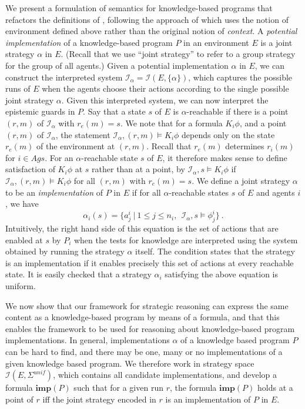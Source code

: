 \documentclass[a4wide]{article}
\theoremstyle{examplesty}
\newcommand{\Ags}{\mathit{Ags}}
\newcommand{\I}{\mathcal{I}}
\newcommand{\Env}{E}
\newcommand{\sgy}{\alpha}
\newcommand{\unif}{\mathit{unif}}
\newcommand{\Strat}{\Sigma}
\begin{document}
We present a formulation of semantics for knowledge-based programs that 
refactors the definitions of \cite{FHMV1997}, following the approach 
of \cite{MeydenTARK96} which uses the 
notion of environment defined above rather than the original notion of {\em context}. 
A {\em potential implementation} of a knowledge-based program $P$ in an environment $\Env$
is a joint strategy $\sgy$  in $\Env$. 
(Recall that we use ``joint strategy'' to refer to a group strategy for the group of all agents.)
Given  a potential implementation $\sgy$  in $\Env$, 
we can construct the interpreted system 
$\I_\sgy= \I(\Env,\{\sgy\})$, 
which captures the possible runs of $\Env$ when 
the agents choose their actions according to the single possible joint strategy $\sgy$. 
Given this interpreted system, we can now interpret the epistemic guards in $P$. 
Say that a state $s$ of $\Env$ is $\sgy$-reachable if there is a point $(r,m)$ of 
$\I_\sgy$ 
with $r_e(m) = s$. 
We note that for a formula $K_i \phi$, and a point $(r,m)$ of  $\I_\sgy$, 
the statement $\I_\sgy,(r,m) \models K_i \phi$ depends only on the state $r_e(m)$
of the environment at $(r,m)$. 
Recall that $r_e(m)$ determines $r_i(m)$ for $i \in \Ags$. 
For an $\sgy$-reachable state $s$ of  $\Env$, 
it therefore makes sense to define satisfaction of $K_i\phi$ at $s$ rather than at a point, by 
$\I_\sgy,s \models K_i \phi$ if  $\I_\sgy,(r,m) \models K_i \phi$ for all $(r,m)$ with $r_e(m) = s$. 
We define 
a joint strategy 
$\sgy$ to be an {\em implementation} of $P$ in $\Env$ if for all 
$\sgy$-reachable states $s$ of $\Env$ and agents $i$, we have 
$$ \sgy_i(s) = \{ a^i_j ~|~  1\leq j\leq n_i,~~\I_\sgy,s \models \phi^i_j\}~.$$
Intuitively, the right hand side of this equation is the set of actions that are 
enabled at $s$ by $P_i$ when the tests for knowledge are interpreted using the system 
obtained by running the strategy $\sgy$ itself. 
The condition states that the strategy is an implementation 
if it enables precisely this set of actions at every reachable state. 
It is easily checked that a strategy $\alpha_i$ satisfying the above equation is uniform. 

We now show that our framework for strategic reasoning can express the 
same content as a knowledge-based program by means of a formula, and that this 
enables the framework to be used for reasoning about knowledge-based program 
implementations. 
In general, implementations $\alpha$ of a knowledge based program $P$ can be hard to find, and
there may be one, many or no implementations of a given knowledge based program. 
We therefore work in strategy space $\I(E, \Strat^\unif)$, which contains all candidate 
implementations, and develop a formula $\mathbf{imp}(P)$ such that 
for a given run $r$, the formula $\mathbf{imp}(P)$  holds at a point of $r$ iff 
the joint strategy encoded in $r$ is an implementation of $P$ in $E$. 
\end{document}
